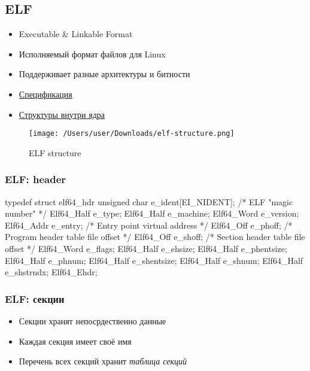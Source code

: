 \subsection{ELF}
  \begin{itemize}
    \item Executable \& Linkable Format
    \item Исполняемый формат файлов для Linux
    \item Поддерживает разные архитектуры и битности
    \item \href{http://refspecs.linuxbase.org/elf/x86_64-abi-0.99.pdf}{Спецификация}
    \item \href{https://github.com/torvalds/linux/blob/master/include/uapi/linux/elf.h}{Структуры внутри ядра}
  \end{itemize}

\begin{figure}[H]
\centering
  \texttt{[image: /Users/user/Downloads/elf-structure.png]}
  \caption{ELF structure}
  \label{fig:elf_structure}
\end{figure} 
  
\subsubsection{ELF: header}

\begin{cminted}
typedef struct elf64_hdr {
  unsigned char  e_ident[EI_NIDENT];  /* ELF "magic number" */
  Elf64_Half e_type;
  Elf64_Half e_machine;
  Elf64_Word e_version;
  Elf64_Addr e_entry;    /* Entry point virtual address */
  Elf64_Off e_phoff;    /* Program header table file offset */
  Elf64_Off e_shoff;    /* Section header table file offset */
  Elf64_Word e_flags;
  Elf64_Half e_ehsize;
  Elf64_Half e_phentsize;
  Elf64_Half e_phnum;
  Elf64_Half e_shentsize;
  Elf64_Half e_shnum;
  Elf64_Half e_shstrndx;
} Elf64_Ehdr;
\end{cminted}

\subsubsection{ELF: секции}
  \begin{itemize}
    \item Секции хранят непосрдественно данные
    \item Каждая секция имеет своё имя
    \item Перечень всех секций хранит \textit{таблица секций}
  \end{itemize}
    
